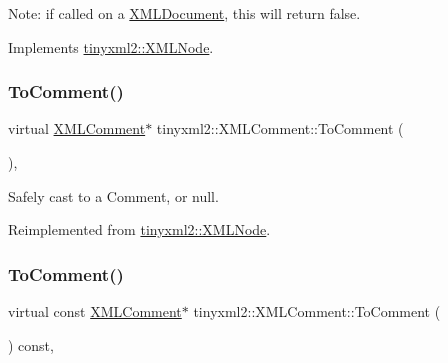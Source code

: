Note\+: if called on a \hyperlink{classtinyxml2_1_1_x_m_l_document}{X\+M\+L\+Document}, this will return false. 

Implements \hyperlink{classtinyxml2_1_1_x_m_l_node_a7ce18b751c3ea09eac292dca264f9226}{tinyxml2\+::\+X\+M\+L\+Node}.

\mbox{\label{classtinyxml2_1_1_x_m_l_comment_a8093e1dc8a34fa446d9dc3fde0e6c0ee}} 
\subsubsection{\texorpdfstring{To\+Comment()}{ToComment()}\hspace{0.1cm}{\footnotesize\ttfamily [1/2]}}
{\footnotesize\ttfamily virtual \hyperlink{classtinyxml2_1_1_x_m_l_comment}{X\+M\+L\+Comment}$\ast$ tinyxml2\+::\+X\+M\+L\+Comment\+::\+To\+Comment (\begin{DoxyParamCaption}{ }\end{DoxyParamCaption})\hspace{0.3cm}{\ttfamily [inline]}, {\ttfamily [virtual]}}



Safely cast to a Comment, or null. 



Reimplemented from \hyperlink{classtinyxml2_1_1_x_m_l_node_aff47671055aa99840a1c1ebd661e63e3}{tinyxml2\+::\+X\+M\+L\+Node}.

\mbox{\label{classtinyxml2_1_1_x_m_l_comment_a8e60caf06d8e88876a94b81db026b85c}} 
\subsubsection{\texorpdfstring{To\+Comment()}{ToComment()}\hspace{0.1cm}{\footnotesize\ttfamily [2/2]}}
{\footnotesize\ttfamily virtual const \hyperlink{classtinyxml2_1_1_x_m_l_comment}{X\+M\+L\+Comment}$\ast$ tinyxml2\+::\+X\+M\+L\+Comment\+::\+To\+Comment (\begin{DoxyParamCaption}{ }\end{DoxyParamCaption}) const\hspace{0.3cm}{\ttfamily [inline]}, {\ttfamily [virtual]}}



